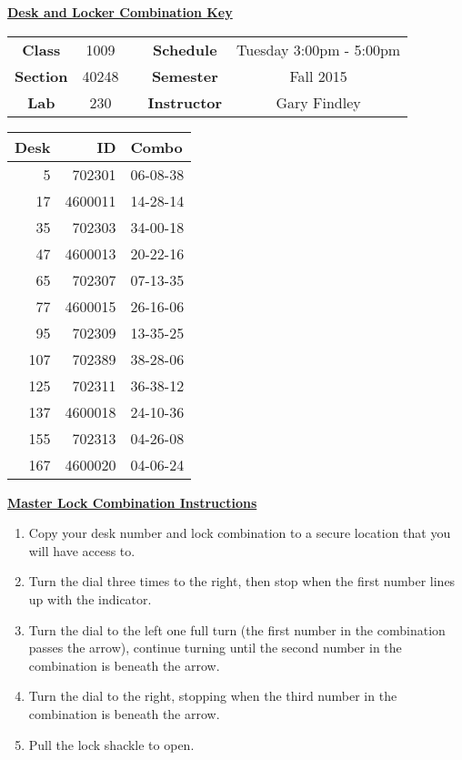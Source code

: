 \documentclass[12pt]{article}
\begin{document}
\thispagestyle{empty}

\begin{center}
	{\huge\textbf{\underline{ Desk and Locker Combination Key}}}
\end{center}


\begin{table}[h]
  \centering
  \begin{tabular}{ccccc}

  \textbf{Class} & 1009 & {\qquad} &\textbf{Schedule} & Tuesday 3:00pm - 5:00pm \\
  \textbf{Section} & 40248 & {\qquad} & \textbf{Semester} & Fall 2015 \\
  \textbf{Lab} & 230 & {\qquad} & \textbf{Instructor} & Gary Findley \\
  \end{tabular}
\end{table}
 \vspace{0.5in}
\begin{minipage}{0.4\textwidth}

\begin{tabular}{rrl}
\toprule
 Desk &       ID &     Combo \\
\midrule
    5 &   702301 &  06-08-38 \\
   17 &  4600011 &  14-28-14 \\
   35 &   702303 &  34-00-18 \\
   47 &  4600013 &  20-22-16 \\
   65 &   702307 &  07-13-35 \\
   77 &  4600015 &  26-16-06 \\
   95 &   702309 &  13-35-25 \\
  107 &   702389 &  38-28-06 \\
  125 &   702311 &  36-38-12 \\
  137 &  4600018 &  24-10-36 \\
  155 &   702313 &  04-26-08 \\
  167 &  4600020 &  04-06-24 \\
\bottomrule
\end{tabular}


\end{minipage}
\begin{minipage}{0.4\textwidth}
\underline{{\large \textbf{Master Lock Combination Instructions}}}
\begin{enumerate}
\item Copy your desk number and lock combination to a secure location that you will have access to.
\item Turn the dial three times to the right, then stop when the first number lines up with the indicator.
\item Turn the dial to the left one full turn (the first number in the combination passes the arrow), continue turning until the second number in the combination is beneath the arrow.
\item Turn the dial to the right, stopping when the third number in the combination is beneath the arrow.
\item Pull the lock shackle to open.
\end{enumerate}
\end{minipage}
\end{document}
